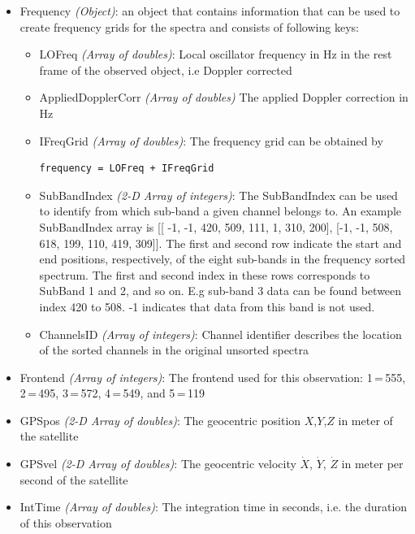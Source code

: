 \begin{itemize}
   \item Frequency \emph{(Object)}: an object that contains information that can be used to create frequency grids for the spectra
                       and consists of following keys:
    \begin{itemize}
      \item LOFreq \emph{(Array of doubles)}: Local oscillator frequency in Hz in the rest frame of the
                       observed object, i.e Doppler corrected
      \item AppliedDopplerCorr \emph{(Array of doubles)} The applied Doppler correction in Hz
      \item IFreqGrid \emph{(Array of doubles)}: The frequency grid can be obtained by
                       \begin{verbatim}frequency = LOFreq + IFreqGrid\end{verbatim}
      \item SubBandIndex \emph{(2-D Array of integers)}: The SubBandIndex
                       can be used to identify from which sub-band a given channel belongs to.
                       An example SubBandIndex array is [[ -1, -1, 420, 509, 111, 1, 310, 200],
                       [-1, -1, 508, 618, 199, 110, 419, 309]].
                       The first and second row indicate the start and end positions, respectively,
                       of the eight sub-bands in the frequency sorted spectrum.
                       The first and second index in these rows corresponds to SubBand 1 and 2, and so
                       on. E.g sub-band 3 data can be found between index 420 to 508.
                       -1 indicates that data from this band is not used.
     \item ChannelsID \emph{(Array of integers)}: Channel identifier describes the location
                       of the sorted channels in the original unsorted spectra
    \end{itemize}
  \item Frontend \emph{(Array of integers)}: The frontend used for this observation: 1\,=\,555, 2\,=\,495,
                       3\,=\,572, 4\,=\,549, and 5\,=\,119
  \item GPSpos \emph{(2-D Array of doubles)}: The geocentric position $X$,$Y$,$Z$ in meter of the satellite
  \item GPSvel \emph{(2-D Array of doubles)}: The geocentric velocity $\dot X$, $\dot Y$, $\dot Z$ in meter per
                         second of the satellite
  \item IntTime \emph{(Array of doubles)}: The integration time in seconds, i.e. the duration of this observation

\end{itemize}
